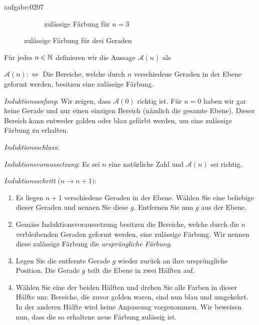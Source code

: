 \begin{antwort}{aufgabe:0207}
\begin{figure}[H]
\begin{subfigure}[b]{0.45\textwidth}
        \caption{zulässige Färbung für $n=3$}
        \label{subfig:3linesFilled}
    \end{subfigure}
    \caption{zulässige Färbung für drei Geraden}
    \label{fig:3lines}
\end{figure}
\noindent
Für jedes $n\in\mathbb{N}$ definieren wir die Aussage $\mathcal{A}(n)$ als
\begin{center}
    $\mathcal{A}(n) :\iff $ Die Bereiche, welche durch $n$ verschiedene Geraden in der Ebene geformt werden, besitzen eine zulässige Färbung.
\end{center}
\begin{aenum}
    \item \textit{Induktionsanfang}: Wir zeigen, dass $\mathcal{A}(0)$ richtig ist. Für $n=0$ haben wir gar keine Gerade und nur einen einzigen Bereich (nämlich die gesamte Ebene). Dieser Bereich kann entweder golden oder blau gefärbt werden, um eine zulässige Färbung zu erhalten.
    \item \textit{Induktionsschluss}:
        \begin{renum}
            \item \textit{Induktionsvoraussetzung}: Es sei $n$ eine natürliche Zahl und $\mathcal{A}(n)$ sei richtig.
            \item \textit{Induktionsschritt} ($n\to n+1)$:
            \begin{enumerate}
                \item Es liegen $n+1$ verschiedene Geraden in der Ebene. Wählen Sie eine beliebige dieser Geraden und nennen Sie diese $g$. Entfernen Sie nun $g$ aus der Ebene.
                \item Gemäss Induktionsvoraussetzung besitzen die Bereiche, welche durch die $n$ verbleibenden Geraden geformt werden, eine zulässige Färbung. Wir nennen diese zulässige Färbung die \textit{ursprüngliche Färbung}.
                \item Legen Sie die entfernte Gerade $g$ wieder zurück an ihre ursprüngliche Position. Die Gerade $g$ teilt die Ebene in zwei Hälften auf.
                \item Wählen Sie eine der beiden Hälften und drehen Sie alle Farben in dieser Hälfte um: Bereiche, die zuvor golden waren, sind nun blau und umgekehrt. In der anderen Hälfte wird keine Anpassung vorgenommen. Wir beweisen nun, dass die so erhaltene neue Färbung zulässig ist.

\end{enumerate}
\end{renum}
\end{aenum}
\end{antwort}
